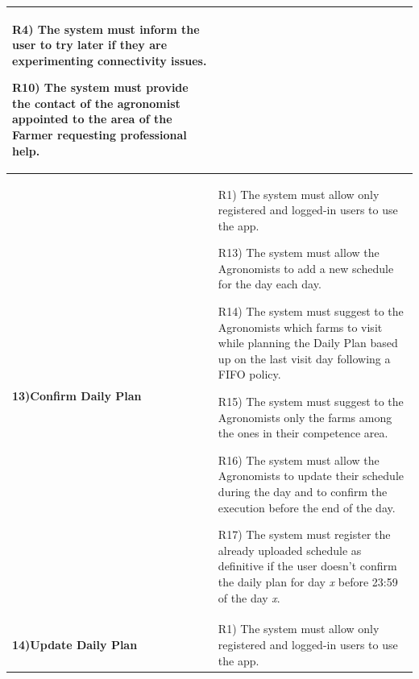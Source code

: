 \documentclass[table, 12pt]{article}
\begin{document}
\begin{itemize}
\begin{longtable}{|p{}|p{}|}
                                                                                            R4) The system must inform the user to try later if they are experimenting connectivity issues.

                                                                                            R10) The system must provide the contact of the agronomist appointed to the area of the Farmer requesting professional help.\\\hline
                                                                                  
                    \cellcolor{SpringGreen!50}\textbf{13)Confirm Daily Plan}\centering &  R1) The system must allow only registered and logged-in users to use the app.
                    
                                                                                          R13) The system must allow the Agronomists to add a new schedule for the day each day.

                                                                                          R14) The system must suggest to the Agronomists which
                                                                                          farms to visit while planning the Daily Plan based
                                                                                          up on the last visit day following a FIFO policy.

                                                                                          R15) The system must suggest to the Agronomists only the farms among the ones in their competence area.
                                                                                        
                                                                                          R16) The system must allow the Agronomists to update their schedule during the day and to confirm the execution before the end of the day.
                                                                                          
                                                                                          R17) The system must register the already uploaded schedule as definitive if the user doesn't confirm the daily plan for day \textit{x} before 23:59 of the day \textit{x}.\\\hline
                    \cellcolor{SpringGreen!50}\textbf{14)Update Daily Plan}\centering &  R1) The system must allow only registered and logged-in users to use the app.
                    

\end{longtable}
\end{itemize}
\end{document}

